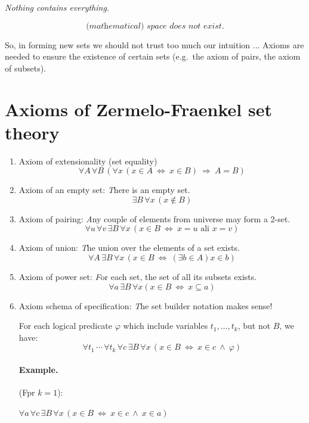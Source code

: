 \documentclass[11pt,paper=b5,footinclude,headinclude]{scrbook} %
\def\inn {{~\wedge~}}
\def\sledi {{~\Rightarrow~}}
\def\cee {{~\Leftrightarrow~}}
\theoremstyle{remark}
\theoremstyle{definition} %
\theoremstyle{theorem} %
\begin{document}
{\centerline \em Nothing contains everything.}

$$ \textit{(mathematical) space does not exist.}$$

So, in forming new sets we should not trust too much our intuition ...
Axioms are needed to ensure the existence of certain sets (e.g.~the axiom of pairs, the axiom of subsets).

\section{Axioms of Zermelo-Fraenkel set theory}

\begin{enumerate}
	\item Axiom of extensionality (set equality)
	$$\forall A\, \forall B\, (\forall x \,(x\in A \cee x\in B) \sledi A = B)$$
	
	\item Axiom of an empty set:
	{\emph There is an empty set.}
	$$\exists B\, \forall x\, (x\not \in B)$$
	
	\item Axiom of pairing: {\emph Any couple of elements from universe may form a 2-set.}
	$$\forall u\, \forall v\, \exists B\, \forall x\, (x\in B \cee x = u\textrm{ ali }x = v)$$
	
	\item Axiom of union: {\emph The union over the elements of a set exists. }
	$$\forall A\, \exists B\, \forall x\, (x\in B \cee (\exists b\in A) x\in b)$$
	
	\item Axiom of power set: {\emph For each set, the set of all its subsets exists.}
	$$\forall a\, \exists B\, \forall x (x\in B \cee x\subseteq a)$$
	
	\item Axiom schema of specification: {\emph  The set builder notation makes sense!}
	
	For each logical predicate $\varphi$ which include variables $t_1,\ldots, t_k$, but not  $B$, we have:
	$$\forall t_1\,\cdots\, \forall t_k\,\forall c\,\exists B \,\forall x \,(x\in B \cee x\in c \inn \varphi)$$
	
	\paragraph{Example.}
	(Fpr $k = 1$):
	
	$\forall a \,\forall c \,\exists B \, \forall x\, (x\in B \cee x\in c \inn x\in a)$
	

\end{enumerate}
\end{document}
